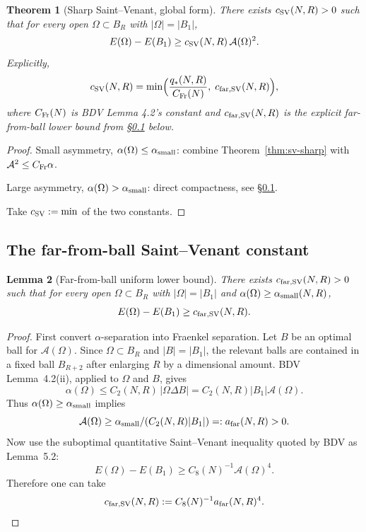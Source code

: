 \documentclass[11pt]{amsart}
\newtheorem{theorem}{Theorem}[section]
\newtheorem{lemma}[theorem]{Lemma}
\theoremstyle{definition}
\newcommand{\abs}[1]{\left|#1\right|}
\begin{document}
\begin{theorem}[Sharp Saint--Venant, global form]\label{thm:sv-global}
There exists $c_{\rm SV}(N,R)>0$ such that for every open
$\Omega\subset B_R$ with $\abs{\Omega}=\abs{B_1}$,
\[
E(\Omega)-E(B_1)\ge c_{\rm SV}(N,R)\,\mathcal A(\Omega)^2.
\]
Explicitly,
\[
c_{\rm SV}(N,R)
=\min\Bigl(\frac{q_*(N,R)}{C_{\rm Fr}(N)},\;c_{\rm far,SV}(N,R)\Bigr),
\]
where $C_{\rm Fr}(N)$ is BDV Lemma 4.2's constant and $c_{\rm far,SV}(N,R)$
is the explicit far-from-ball lower bound from \S\ref{sec:far} below.
\end{theorem}

\begin{proof}
Small asymmetry, $\alpha(\Omega)\le\alpha_{\rm small}$:
combine Theorem~\ref{thm:sv-sharp} with $\mathcal A^2\le C_{\rm Fr}\alpha$.

Large asymmetry, $\alpha(\Omega)>\alpha_{\rm small}$:
direct compactness, see \S\ref{sec:far}.

Take $c_{\rm SV}:=\min$ of the two constants.
\end{proof}

\subsection{The far-from-ball Saint--Venant constant}\label{sec:far}

\begin{lemma}[Far-from-ball uniform lower bound]\label{lem:far}
There exists $c_{\rm far,SV}(N,R)>0$ such that for every open
$\Omega\subset B_R$ with $\abs{\Omega}=\abs{B_1}$ and
$\alpha(\Omega)\ge\alpha_{\rm small}(N,R)$,
\[
E(\Omega)-E(B_1)\ge c_{\rm far,SV}(N,R).
\]
\end{lemma}

\begin{proof}
First convert $\alpha$-separation into Fraenkel separation. Let $B$ be an
optimal ball for $\mathcal A(\Omega)$. Since $\Omega\subset B_R$ and
$|B|=|B_1|$, the relevant balls are contained in a fixed ball $B_{R+2}$ after
enlarging $R$ by a dimensional amount. BDV Lemma~4.2(ii), applied to
$\Omega$ and $B$, gives
\[
\alpha(\Omega)\le C_2(N,R)\,|\Omega\Delta B|
=C_2(N,R)|B_1|\mathcal A(\Omega).
\]
Thus $\alpha(\Omega)\ge\alpha_{\rm small}$ implies
\[
\mathcal A(\Omega)\ge
\alpha_{\rm small}/(C_2(N,R)|B_1|)=:a_{\rm far}(N,R)>0.
\]
Now use the suboptimal quantitative Saint--Venant inequality quoted by BDV as
Lemma~5.2:
\[
E(\Omega)-E(B_1)\ge C_8(N)^{-1}\mathcal A(\Omega)^4.
\]
Therefore one can take
\[
c_{\rm far,SV}(N,R):=C_8(N)^{-1}a_{\rm far}(N,R)^4.
\]
\end{proof}
\end{document}
